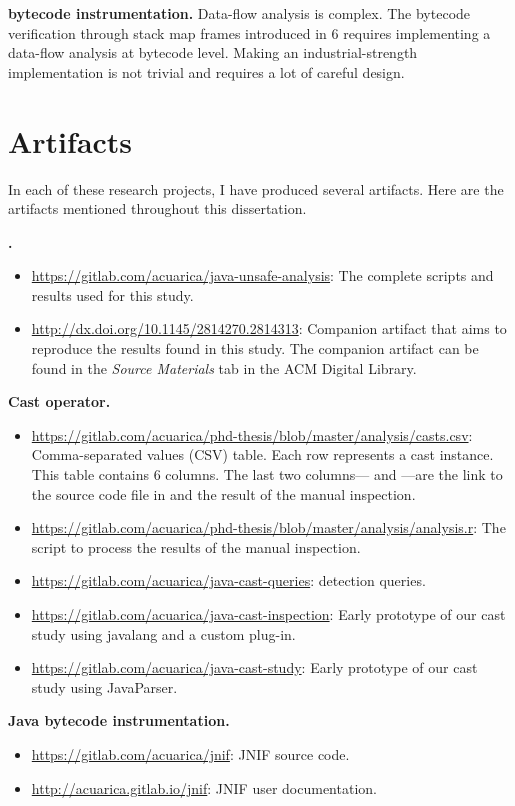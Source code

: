 \textbf{\java{} bytecode instrumentation.}
Data-flow analysis is complex.
The bytecode verification through stack map frames introduced in \java{} 6 requires implementing a data-flow analysis at bytecode level.
Making an industrial-strength implementation is not trivial
and requires a lot of careful design.


\section{Artifacts}
\newcommand{\urlartifact}[2]{\item{\footnotesize\url{#1}}: #2}

In each of these research projects,
I have produced several artifacts.
Here are the artifacts mentioned throughout this dissertation.

\textbf{\unsafe{} \api{}.}
\begin{itemize}
\urlartifact{https://gitlab.com/acuarica/java-unsafe-analysis}{The complete scripts and results used for this study.}
\urlartifact{http://dx.doi.org/10.1145/2814270.2814313}{Companion artifact that aims to reproduce the results found in this study.
The companion artifact can be found in the \emph{Source Materials} tab in the ACM Digital Library.}
\end{itemize}

\textbf{Cast operator.}
\begin{itemize}
\urlartifact{https://gitlab.com/acuarica/phd-thesis/blob/master/analysis/casts.csv}{Comma-separated values (CSV) table.
Each row represents a cast instance.
This table contains 6 columns.
The last two columns---\col{link} and \col{value}---are the link to the source code file in \lgtm{} and the result of the manual inspection.}
\urlartifact{https://gitlab.com/acuarica/phd-thesis/blob/master/analysis/analysis.r}{The script to process the results of the manual inspection.}
\urlartifact{https://gitlab.com/acuarica/java-cast-queries}{\ql{} detection queries.}
\urlartifact{https://gitlab.com/acuarica/java-cast-inspection}{Early prototype of our cast study using javalang and a custom \javac{} plug-in.}
\urlartifact{https://gitlab.com/acuarica/java-cast-study}{Early prototype of our cast study using JavaParser.}
\end{itemize}

\textbf{Java bytecode instrumentation.}
\begin{itemize}
\urlartifact{https://gitlab.com/acuarica/jnif}{JNIF source code.}
\urlartifact{http://acuarica.gitlab.io/jnif}{JNIF user documentation.}
\end{itemize}
